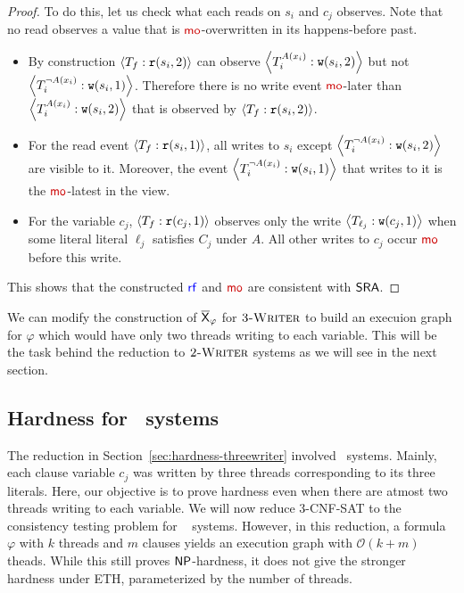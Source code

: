 \begin{proof}
    To do this, let us check what each reads on $s_i$ and $c_j$ observes. Note that no read observes a value that is $\mo$-overwritten in its happens-before past. 
    \begin{itemize}[leftmargin=0.1em]
    \item By construction $\left\langle T_f: \mathtt{r}(s_i, 2)\right\rangle$ can observe $\left\langle T_i^{A(x_i)}:\mathtt{w}(s_i,2)\right\rangle$ but not $\left\langle T_i^{\neg A(x_i)}:\mathtt{w}(s_i,1)\right\rangle$. Therefore there is no write event $\mo$-later than $\left\langle T_i^{A(x_i)}: \mathtt{w}(s_i, 2)\right\rangle$ that is observed by $\left\langle T_f: \mathtt{r}(s_i, 2)\right\rangle$. 
    \item For the read event $\left\langle T_f: \mathtt{r}(s_i, 1)\right\rangle$, all writes to $s_i$ except $\left\langle T_i^{\neg{A(x_i)}}: \mathtt{w}(s_i, 2)\right\rangle$ are visible to it. Moreover, the event $\left\langle T_i^{\neg A(x_i)}: \mathtt{w}(s_i, 1)\right\rangle$ that writes to it is the $\mo$-latest in the view.
    \item For the variable $c_j$, $\left\langle T_f: \mathtt{r}(c_j, 1)\right\rangle$ observes only the write $\left\langle T_{\ell_j}: \mathtt{w}(c_j, 1)\right\rangle$ when some literal literal $\ell_j$ satisfies $C_j$ under $A$. All other writes to $c_j$ occur $\mo$ before this write.
    \end{itemize}
    
    This shows that the constructed $\rf$ and $\mo$ are consistent with $\mathsf{SRA}$.
\end{proof}

We can modify the  construction of $\overline{\mathsf{\color{black}X}}_{\varphi}$ for $\textsc{3-Writer}$ to build an execuion graph for $\varphi$ which would have only two threads writing to each variable. This will be the task  behind the reduction to $\textsc{2-Writer}$ systems as we will see in the next section. 

\subsection{Hardness for  \twowriter\ systems}
\label{sec:hardness-twowriter}

The reduction in Section~\ref{sec:hardness-threewriter} involved \threewriter\ systems.
Mainly, each clause variable $c_j$ was written by three threads corresponding to its three literals. Here, our objective is to prove hardness even when there are atmost two threads writing to each variable. We will now reduce 3-CNF-SAT to the consistency testing problem for \twowriter~ systems. However, in this reduction, a formula $\varphi$ with $k$ threads and $m$ clauses yields an execution graph with $\mathcal{O}(k + m)$ theads. While this still proves $\mathsf{NP}$-hardness, it does not give the stronger hardness under ETH, parameterized by the number of threads. 

